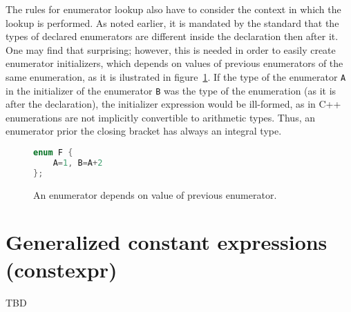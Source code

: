 \documentclass{fithesis3}
\begin{document}
The rules for enumerator lookup also have to consider the context in which the lookup is performed. As noted earlier, it is mandated by the standard that the types of declared enumerators are different inside the declaration then after it. One may find that surprising; however, this is needed in order to easily create enumerator initializers, which depends on values of previous enumerators of the same enumeration, as it is ilustrated in figure~\ref{lst:enumDepends}. If the type of the enumerator \lstinline{A} in the initializer of the enumerator \lstinline{B} was the type of the enumeration (as it is after the declaration), the initializer expression would be ill-formed, as in C++ enumerations are not implicitly convertible to arithmetic types. Thus, an enumerator prior the closing bracket has always an integral type.



\begin{figure}[h]
\begin{lstlisting}[language=C++]
enum F {
	A=1, B=A+2
};
\end{lstlisting}
\caption{An enumerator depends on value of previous enumerator.}
\label{lst:enumDepends}
\end{figure}






\section{Generalized constant expressions (constexpr)}
TBD
\end{document}
